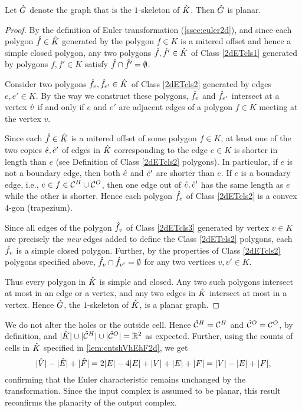 \begin{lem}
  \label{lem:hGplanar}
  Let $\hat{G}$ denote the graph that is the $1$-skeleton of $\hat{K}$. Then $\hat{G}$ is planar.
\end{lem}
\begin{proof}
  By the definition of Euler transformation (\cref{ssec:euler2d}), and since each polygon $\hat{f} \in \hat{K}$ generated by the polygon $f \in K$ is a mitered offset and hence a simple closed polygon, any two polygons $\hat{f}, \hat{f}' \in \hat{K}$ of Class \ref{2dETcls1} generated by polygons $f,f' \in K$ satisfy $\hat{f} \cap \hat{f}' = \emptyset$.

  Consider two polygons $\hat{f}_e, \hat{f}_{e'} \in \hat{K}$ of Class \ref{2dETcls2} generated by edges $e,e' \in K$.
  By the way we construct these polygons, $\hat{f}_e$ and $\hat{f}_{e'}$ intersect at a vertex $\hat{v}$ if and only if $e$ and $e'$ are adjacent edges of a polygon $f \in K$ meeting at the vertex $v$.

  Since each $\hat{f} \in \hat{K}$ is a mitered offset of some polygon $f \in K$, at least one of the two copies $\hat{e}, \hat{e}'$ of edges in $\hat{K}$ corresponding to the edge $e \in K$ is shorter in length than $e$ (see Definition of Class \ref{2dETcls2} polygons).
  In particular, if $e$ is not a boundary edge, then both $\hat{e}$ and $\hat{e}'$ are shorter than $e$.
  If $e$ is a boundary edge, i.e., $e \in f \in \mathcal{C}^H \cup \mathcal{C}^O$, then one edge out of $\hat{e}, \hat{e}'$ has the same length as $e$ while the other is shorter.
  Hence each polygon $\hat{f}_e$ of Class \ref{2dETcls2} is a convex $4$-gon (trapezium).

  Since all edges of the polygon $\hat{f}_v$ of Class \ref{2dETcls3} generated by vertex $v \in K$ are precisely the \emph{new} edges added to define the Class \ref{2dETcls2} polygons, each $\hat{f}_v$ is a simple closed polygon.
  Further, by the properties of Class \ref{2dETcls2} polygons specified above, $\hat{f}_v \cap \hat{f}_{v'} = \emptyset$ for any two vertices $v, v' \in K$.

  Thus every polygon in $\hat{K}$ is simple and closed.
  Any two such polygons intersect at most in an edge or a vertex, and any two edges in $\hat{K}$ intersect at most in a vertex.
  Hence $\hat{G}$, the $1$-skeleton of $\hat{K}$, is a planar graph.
\end{proof}

We do not alter the holes or the outside cell.
Hence $\hat{\mathcal{C}}^H = \mathcal{C}^H$ and $\hat{\mathcal{C}}^O = \mathcal{C}^O$, by definition, and $|\hat{K}| \cup |\hat{\mathcal{C}}^H| \cup |\hat{\mathcal{C}}^O| = {\mathbb R}^2$ as expected.
Further, using the counts of cells in $\hat{K}$ specified in \cref{lem:cntshVhEhF2d}, we get
\[
  |\hat{V}| - |\hat{E}| + |\hat{F}| = 2|E| - 4|E| +  |V| + |E| + |F| = |V| - |E| + |F|,
\]
confirming that the Euler characteristic remains unchanged by the transformation.
Since the input complex is assumed to be planar, this result reconfirms the planarity of the output complex.


